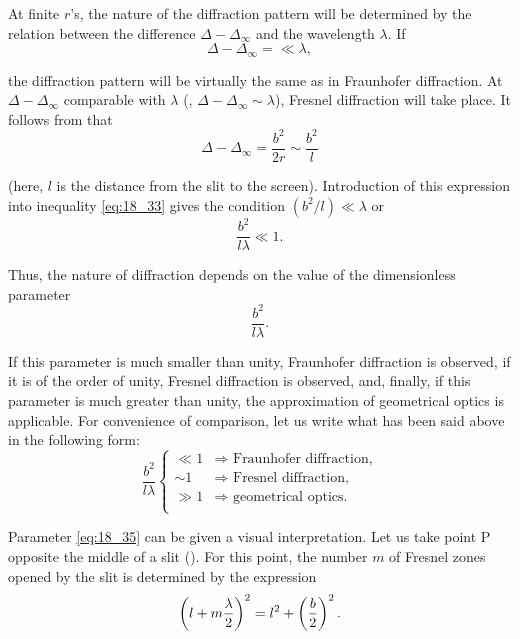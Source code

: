 At finite $r$'s, the nature of the diffraction pattern will be determined by the relation between the difference $\Delta-\Delta_{\infty}$ and the wavelength $\lambda$.
If
\begin{equation}\label{eq:18_33}
	\Delta-\Delta_{\infty} = \ll \lambda,
\end{equation}

\noindent
the diffraction pattern will be virtually the same as in Fraunhofer diffraction.
At $\Delta-\Delta_{\infty}$ comparable with $\lambda$ (\ie, $\Delta-\Delta_{\infty}\sim \lambda$), Fresnel diffraction will take place.
It follows from  that
\begin{equation*}
	\Delta-\Delta_{\infty} = \frac{b^2}{2r} \sim \frac{b^2}{l}
\end{equation*}

\noindent
(here, $l$ is the distance from the slit to the screen).
Introduction of this expression into inequality \eqref{eq:18_33} gives the condition $(b^2/l)\ll\lambda$ or
\begin{equation}\label{eq:18_34}
	\frac{b^2}{l\lambda} \ll 1.
\end{equation}

\noindent
Thus, the nature of diffraction depends on the value of the dimensionless parameter
\vspace{-12pt}
\begin{equation}\label{eq:18_35}
	\frac{b^2}{l\lambda}.
\end{equation}

If this parameter is much smaller than unity, Fraunhofer diffraction is observed, if it is of the order of unity, Fresnel diffraction is observed, and, finally, if this parameter is much greater than unity, the approximation of geometrical optics is applicable.
For convenience of comparison, let us write what has been said above in the following form:
\begin{equation}\label{eq:18_36}
	\frac{b^2}{l\lambda}
	\begin{cases}
		\ll 1 & \Rightarrow \text{ Fraunhofer diffraction,}\\
		\sim 1 & \Rightarrow \text{ Fresnel diffraction,}\\
		\gg 1 & \Rightarrow \text{ geometrical optics.}\\
	\end{cases}
\end{equation}

Parameter \eqref{eq:18_35} can be given a visual interpretation.
Let us take point P opposite the middle of a slit ().
For this point, the number $m$ of Fresnel zones opened by the slit is determined by the expression
\begin{equation*}
	\left(l + m \frac{\lambda}{2}\right)^2 = l^2 + \left(\frac{b}{2}\right)^2.
\end{equation*}

